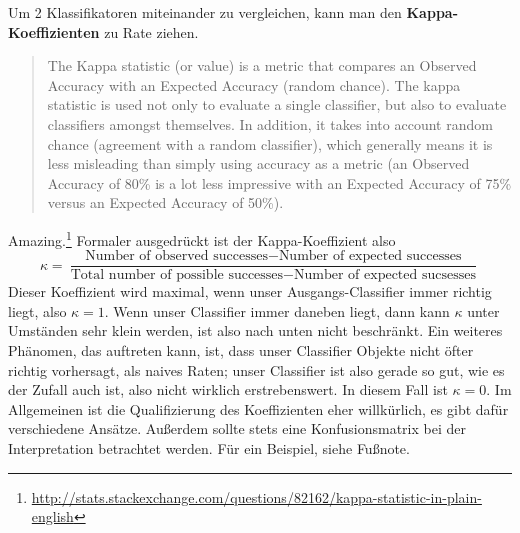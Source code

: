 Um 2 Klassifikatoren miteinander zu vergleichen, kann man den \textbf{Kappa-Koeffizienten}
zu Rate ziehen. 
\begin{quote}
	\glqq The Kappa statistic (or value) is a metric that compares an Observed Accuracy 
	with an Expected Accuracy (random chance). The kappa statistic is used not only
	to evaluate a single classifier, but also to evaluate classifiers amongst 
	themselves. In addition, it takes into account random chance (agreement with a 
	random classifier), which generally means it is less misleading than simply 
	using accuracy as a metric (an Observed Accuracy of 80\% is a lot less 
	impressive with an Expected Accuracy of 75\% versus an
	Expected Accuracy of 50\%).\grqq
\end{quote}
Amazing.\footnote{\url{http://stats.stackexchange.com/questions/82162/kappa-statistic-in-plain-english}}
Formaler ausgedrückt ist der Kappa-Koeffizient also
\[
	\kappa =  \frac{\text{Number of observed successes} - 
	\text{Number of expected successes}}{\text{Total number of possible successes} -
	\text{Number of expected sucsesses}}
\]
Dieser Koeffizient wird maximal, wenn unser Ausgangs-Classifier immer richtig liegt,
also \(\kappa = 1\). Wenn unser Classifier immer daneben liegt, dann kann \(\kappa\)
unter Umständen sehr klein werden, ist also nach unten nicht beschränkt. Ein weiteres
Phänomen, das auftreten kann, ist, dass unser Classifier Objekte nicht öfter richtig 
vorhersagt, als naives Raten; unser Classifier ist also gerade so
gut, wie es der Zufall auch ist, also nicht wirklich erstrebenswert. In diesem Fall
ist \(\kappa = 0\). Im Allgemeinen ist die Qualifizierung des Koeffizienten eher
willkürlich, es gibt dafür verschiedene Ansätze. Außerdem sollte stets eine 
Konfusionsmatrix bei der Interpretation betrachtet werden. Für ein Beispiel, siehe
Fußnote.

